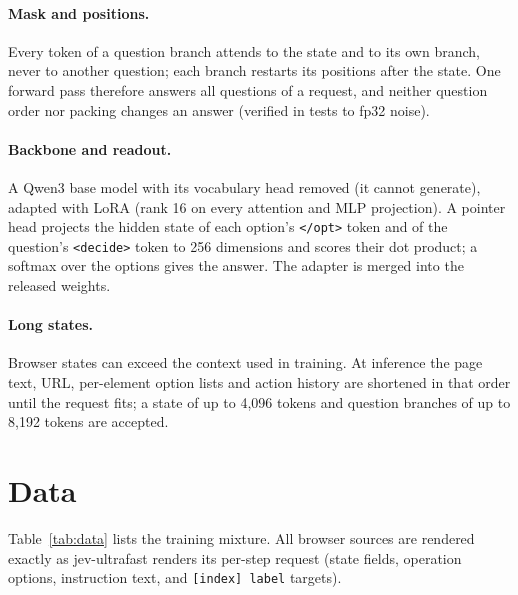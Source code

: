 \documentclass[11pt]{article}
\begin{document}
\paragraph{Mask and positions.} Every token of a question branch attends to the state and to its own branch, never to
another question; each branch restarts its positions after the state. One forward pass therefore answers all questions
of a request, and neither question order nor packing changes an answer (verified in tests to fp32 noise).

\paragraph{Backbone and readout.} A Qwen3 base model \citep{qwen3} with its vocabulary head removed (it cannot
generate), adapted with LoRA \citep{lora} (rank 16 on every attention and MLP projection). A pointer head projects the
hidden state of each option's \texttt{</opt>} token and of the question's \texttt{<decide>} token to 256 dimensions
and scores their dot product; a softmax over the options gives the answer. The adapter is merged into the released
weights.

\paragraph{Long states.} Browser states can exceed the context used in training. At inference the page text, URL,
per-element option lists and action history are shortened in that order until the request fits; a state of up to
4{,}096 tokens and question branches of up to 8{,}192 tokens are accepted.

\section{Data}
\label{sec:data}

Table~\ref{tab:data} lists the training mixture. All browser sources are rendered exactly as jev-ultrafast renders
its per-step request (state fields, operation options, instruction text, and \texttt{[index] label} targets).
\end{document}
